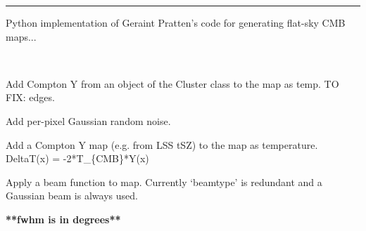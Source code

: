 \documentclass[letterpaper,10pt,english]{sphinxmanual}
\begin{document}
\bigskip\hrule{}\bigskip

\label{PyCosmo:module-PyCosmo.cmb}
Python implementation of Geraint Pratten's code
for generating flat-sky CMB maps...

\begin{fulllineitems}
\label{PyCosmo:PyCosmo.cmb.CMBFlatMap}~

\begin{fulllineitems}
\label{PyCosmo:PyCosmo.cmb.CMBFlatMap.add_cluster_ymap}
Add Compton Y from an object of the Cluster class to the map as temp.
TO FIX: edges.

\end{fulllineitems}


\begin{fulllineitems}
\label{PyCosmo:PyCosmo.cmb.CMBFlatMap.add_noise}
Add per-pixel Gaussian random noise.

\end{fulllineitems}


\begin{fulllineitems}
\label{PyCosmo:PyCosmo.cmb.CMBFlatMap.add_ymap}
Add a Compton Y map (e.g. from LSS tSZ) to the map as temperature.
DeltaT(x) = -2*T\_\{CMB\}*Y(x)

\end{fulllineitems}


\begin{fulllineitems}
\label{PyCosmo:PyCosmo.cmb.CMBFlatMap.apply_beam}
Apply a beam function to map.
Currently `beamtype' is redundant and a Gaussian beam is always used.

\textbf{**fwhm is in degrees**}


\end{fulllineitems}
\end{fulllineitems}
\end{document}
